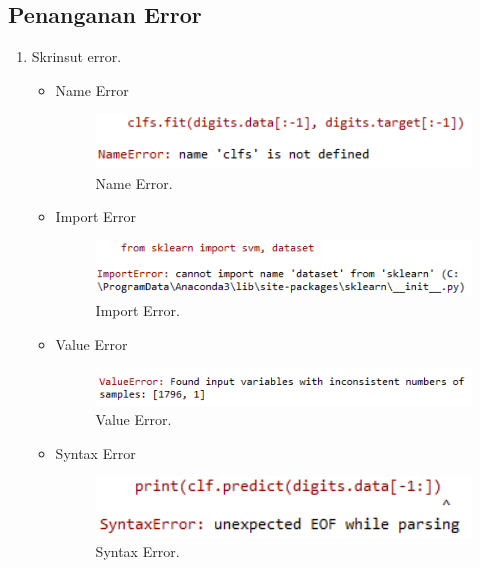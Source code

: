 \subsection{Penanganan Error}
\begin{enumerate}
	\item Skrinsut error.
	\begin{itemize}
		\item Name Error
		\hfill\break
		\begin{figure}[H]
			\includegraphics[width=1\textwidth]{figures/1174006/chapter1/error/err3.PNG}
			\centering
			\caption{Name Error.}
		\end{figure}
		\item Import Error
		\hfill\break
		\begin{figure}[H]
			\includegraphics[width=1\textwidth]{figures/1174006/chapter1/error/err1.PNG}
			\centering
			\caption{Import Error.}
		\end{figure}
		\item Value Error
		\hfill\break
		\begin{figure}[H]
			\includegraphics[width=1\textwidth]{figures/1174006/chapter1/error/err2.PNG}
			\centering
			\caption{Value Error.}
		\end{figure}
		\item Syntax Error
		\hfill\break
		\begin{figure}[H]
			\includegraphics[width=1\textwidth]{figures/1174006/chapter1/error/err4.PNG}
			\centering
			\caption{Syntax Error.}
		\end{figure}
	\end{itemize}

\end{enumerate}
